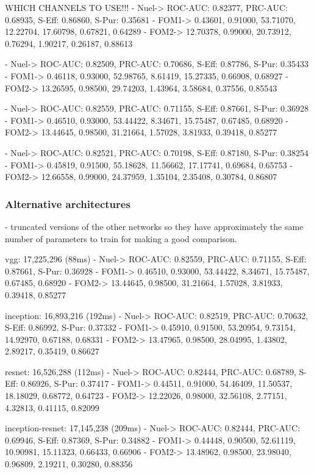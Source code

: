 WHICH CHANNELS TO USE!!!
- Nuel-> ROC-AUC: 0.82377, PRC-AUC: 0.68935, S-Eff: 0.86860, S-Pur: 0.35681
- FOM1-> 0.43601, 0.91000, 53.71070, 12.22704, 17.60798, 0.67821, 0.64289
- FOM2-> 12.70378, 0.99000, 20.73912, 0.76294, 1.90217, 0.26187, 0.88613

- Nuel-> ROC-AUC: 0.82509, PRC-AUC: 0.70686, S-Eff: 0.87786, S-Pur: 0.35433
- FOM1-> 0.46118, 0.93000, 52.98765, 8.61419, 15.27335, 0.66908, 0.68927
- FOM2-> 13.26595, 0.98500, 29.74203, 1.43964, 3.58684, 0.37556, 0.85543

- Nuel-> ROC-AUC: 0.82559, PRC-AUC: 0.71155, S-Eff: 0.87661, S-Pur: 0.36928
- FOM1-> 0.46510, 0.93000, 53.44422, 8.34671, 15.75487, 0.67485, 0.68920
- FOM2-> 13.44645, 0.98500, 31.21664, 1.57028, 3.81933, 0.39418, 0.85277

- Nuel-> ROC-AUC: 0.82521, PRC-AUC: 0.70198, S-Eff: 0.87180, S-Pur: 0.38254
- FOM1-> 0.45819, 0.91500, 55.18628, 11.56662, 17.17741, 0.69684, 0.65753
- FOM2-> 12.66558, 0.99000, 24.37959, 1.35104, 2.35408, 0.30784, 0.86807

\subsubsection*{Alternative architectures} %

- truncated versions of the other networks so they have approximately the same number of
parameters to train for making a good comparison.

vgg: 17,225,296 (88ms)
- Nuel-> ROC-AUC: 0.82559, PRC-AUC: 0.71155, S-Eff: 0.87661, S-Pur: 0.36928
- FOM1-> 0.46510, 0.93000, 53.44422, 8.34671, 15.75487, 0.67485, 0.68920
- FOM2-> 13.44645, 0.98500, 31.21664, 1.57028, 3.81933, 0.39418, 0.85277

inception: 16,893,216 (192ms)
- Nuel-> ROC-AUC: 0.82519, PRC-AUC: 0.70632, S-Eff: 0.86992, S-Pur: 0.37332
- FOM1-> 0.45910, 0.91500, 53.20954, 9.73154, 14.92970, 0.67188, 0.68331
- FOM2-> 13.47965, 0.98500, 28.04995, 1.43802, 2.89217, 0.35419, 0.86627

resnet: 16,526,288 (112ms)
- Nuel-> ROC-AUC: 0.82444, PRC-AUC: 0.68789, S-Eff: 0.86926, S-Pur: 0.37417
- FOM1-> 0.44511, 0.91000, 54.46409, 11.50537, 18.18029, 0.68772, 0.64723
- FOM2-> 12.22026, 0.98000, 32.56108, 2.77151, 4.32813, 0.41115, 0.82099

inception-resnet: 17,145,238 (209ms)
- Nuel-> ROC-AUC: 0.82444, PRC-AUC: 0.69946, S-Eff: 0.87369, S-Pur: 0.34882
- FOM1-> 0.44448, 0.90500, 52.61119, 10.90981, 15.11323, 0.66433, 0.66906
- FOM2-> 13.48962, 0.98500, 23.98040, 0.96809, 2.19211, 0.30280, 0.88356

